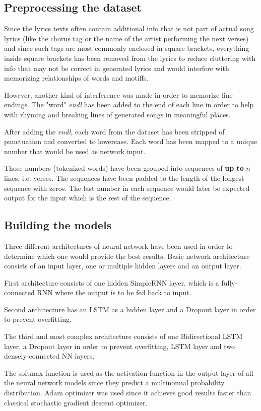 \documentclass[conference]{IEEEtran}
\begin{document}
\subsection{Preprocessing the dataset}
Since the lyrics texts often contain additional info that is not part of actual
song lyrics (like the chorus tag or the name of the artist performing the
next verses) and since such tags are most commonly enclosed in square brackets,
everything inside square brackets has been removed from the lyrics to
reduce cluttering with info that may not be correct in generated lyrics and
would interfere with memorizing relationships of words and motiffs.

However, another kind of interference was made in
order to memorize line endings. The "word" \textit{endl} has been added to the
end of each line in order to help with rhyming and breaking lines of
generated songs in meaningful places.

After adding the \textit{endl}, each word from the dataset has been stripped of
punctuation and converted to lowercase. Each word has been mapped to a unique
number that would be used as network input.

Those numbers (tokenized words) have been grouped into sequences of 
\textbf{up to} $n$ lines, i.e. verses. The sequences have been padded to the
length of the longest sequence with zeros. The last number in each sequence
would later be expected output for the input which is the rest of the sequence.

\subsection{Building the models}
Three different architectures of neural network have been used in order to determine which one would provide the best results.
Basic network architecture consists of an input layer, one or multiple hidden layers and an output layer.

First architecture consists of one hidden SimpleRNN layer, which is a fully-connected RNN where the output is to be fed back to input.

Second architecture has an LSTM as a hidden layer and a Dropout layer in order to prevent overfitting.

The third and most complex architecture consists of one Bidirectional LSTM layer, a Dropout layer in order to prevent overfitting, LSTM layer and two densely-connected NN layers.

The softmax function is used as the activation function in the output layer of all the neural network models 
since they predict a multinomial probability distribution. 
Adam optimizer was used since it achieves good results faster than classical stochastic gradient descent optimizer.
\end{document}
